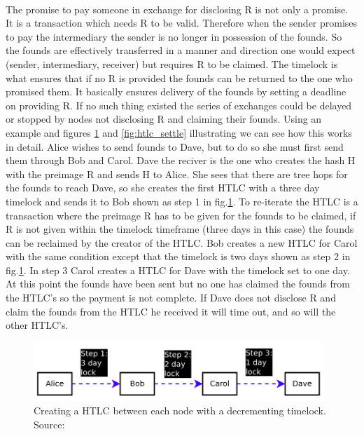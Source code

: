 \documentclass[informationsecurity]{gucmasterproject}
\begin{document}
\paragraph{}
The promise to pay someone in exchange for disclosing R is not only a promise. It is a transaction which needs R to be valid. Therefore when the sender promises to pay the intermediary the sender is no longer in possession of the founds. So the founds are effectively transferred in a manner and direction one would expect (sender, intermediary, receiver) but requires R to be claimed. The timelock is what ensures that if no R is provided the founds can be returned to the one who promised them. It basically ensures delivery of the founds by setting a deadline on providing R. If no such thing existed the series of exchanges could be delayed or stopped by nodes not disclosing R and claiming their founds.
Using an example and figures \ref{fig:htlc_promise} and \ref{fig:htlc_settle} illustrating we can see how this works in detail.
Alice wishes to send founds to Dave, but to do so she must first send them through Bob and Carol. Dave the reciver is the one who creates the hash H with the preimage R and sends H to Alice. She sees that there are tree hops for the founds to reach Dave, so she creates the first HTLC with a three day timelock and sends it to Bob shown as step 1 in fig.\ref{fig:htlc_promise}. To re-iterate the HTLC is a transaction where the preimage R has to be given for the founds to be claimed, if R is not given within the timelock timeframe (three days in this case) the founds can be reclaimed by the creator of the HTLC. Bob creates a new HTLC for Carol with the same condition except that the timelock is two days shown as step 2 in fig.\ref{fig:htlc_promise}. In step 3 Carol creates a HTLC for Dave with the timelock set to one day. At this point the founds have been sent but no one has claimed the founds from the HTLC's so the payment is not complete. If Dave does not disclose R and claim the founds from the HTLC he received it will time out, and so will the other HTLC's.

\begin{figure}[h]
    \centering
    \includegraphics[width=11cm]{figs/htlc_promise.png}
    \caption{ Creating a HTLC between each node with a decrementing timelock. Source: \cite{poon2015bitcoin}}
    \label{fig:htlc_promise}
\end{figure}
\end{document}
